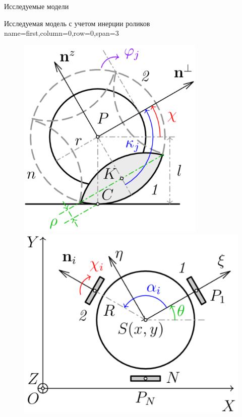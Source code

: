 \begin{myposter}{
    Исследуемые модели
}

    \headerbox
    {Исследуемая модель с учетом инерции роликов}
    {name=first,column=0,row=0,span=3}
    {
        {\huge\bf
            \begin{figure}[H]
                \centering
                    \includegraphics[width=0.8\textwidth]{content/pic/asypng/pic_wheel.png}
                \endminipage
                \qquad
                    \includegraphics[width=1.05\textwidth]{content/pic/asypng/pic_cart.png}
                \endminipage
            \end{figure}
        }
    }
    

\end{myposter}
